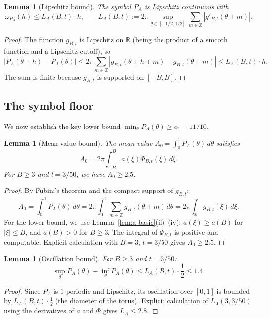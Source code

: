 \documentclass[11pt,a4paper]{article}
\newtheorem{lemma}[theorem]{Lemma}
\theoremstyle{definition}
\theoremstyle{remark}
\newcommand{\R}{\mathbb{R}}
\newcommand{\Z}{\mathbb{Z}}
\begin{document}
\begin{lemma}[Lipschitz bound]\label{lem:PA-lip}
The symbol $P_A$ is Lipschitz continuous with
\[
  \omega_{P_A}(h) \leq L_A(B, t) \cdot h, \qquad
  L_A(B, t) := 2\pi \sup_{\theta \in [-1/2, 1/2]} \sum_{m \in \Z} |g'_{B,t}(\theta + m)|.
\]
\end{lemma}

\begin{proof}
The function $g_{B,t}$ is Lipschitz on $\R$ (being the product of a smooth function and a Lipschitz cutoff), so
\[
  |P_A(\theta + h) - P_A(\theta)| \leq 2\pi \sum_{m \in \Z} |g_{B,t}(\theta + h + m) - g_{B,t}(\theta + m)|
  \leq L_A(B, t) \cdot h.
\]
The sum is finite because $g_{B,t}$ is supported on $[-B, B]$.
\end{proof}

\subsection{The symbol floor}

We now establish the key lower bound $\min_\theta P_A(\theta) \geq c_* = 11/10$.

\begin{lemma}[Mean value bound]\label{lem:mean}
The mean value $A_0 = \int_0^1 P_A(\theta)\, d\theta$ satisfies
\[
  A_0 = 2\pi \int_{-B}^{B} a(\xi) \Phi_{B,t}(\xi)\, d\xi.
\]
For $B \geq 3$ and $t = 3/50$, we have $A_0 \geq 2.5$.
\end{lemma}

\begin{proof}
By Fubini's theorem and the compact support of $g_{B,t}$:
\[
  A_0 = \int_0^1 P_A(\theta)\, d\theta = 2\pi \int_0^1 \sum_{m \in \Z} g_{B,t}(\theta + m)\, d\theta
      = 2\pi \int_{\R} g_{B,t}(\xi)\, d\xi.
\]
For the lower bound, we use Lemma~\ref{lem:a-basic}(ii)--(iv): $a(\xi) \geq a(B)$ for $|\xi| \leq B$, and $a(B) > 0$ for $B \geq 3$. The integral of $\Phi_{B,t}$ is positive and computable. Explicit calculation with $B = 3$, $t = 3/50$ gives $A_0 \geq 2.5$.
\end{proof}

\begin{lemma}[Oscillation bound]\label{lem:osc}
For $B \geq 3$ and $t = 3/50$:
\[
  \sup_\theta P_A(\theta) - \inf_\theta P_A(\theta) \leq L_A(B, t) \cdot \frac{1}{2} \leq 1.4.
\]
\end{lemma}

\begin{proof}
Since $P_A$ is $1$-periodic and Lipschitz, its oscillation over $[0, 1]$ is bounded by $L_A(B, t) \cdot \frac{1}{2}$ (the diameter of the torus). Explicit calculation of $L_A(3, 3/50)$ using the derivatives of $a$ and $\Phi$ gives $L_A \leq 2.8$.
\end{proof}
\end{document}
